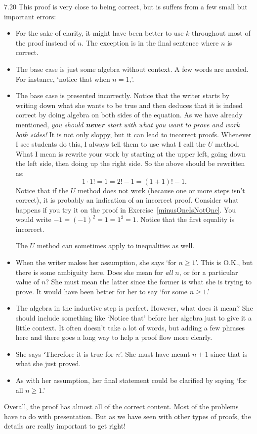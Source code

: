 \begin{Answer}{7.20}
This proof is very close to being correct, but is suffers from a few small but important errors:
\begin{itemize}
\item
For the sake of clarity, it might have been better to use $k$ throughout most of the proof
instead of $n$.  The exception is in the final sentence where $n$ is correct.
\item
The base case is just some algebra without context.  A few words are needed.  For instance,
`notice that when $n=1$,'.
\item
The base case is presented incorrectly.  Notice that the writer starts by writing down what
she wants to be true and then deduces that it is indeed correct by doing algebra on both sides
of the equation.  As we have already mentioned,
{\em you should {\bf never} start with what you want to prove and work both sides!}
It is not only sloppy, but it can lead to incorrect proofs.
Whenever I see students do this, I always tell them to use what I call the $U$ method.  What I mean
is rewrite your work by starting at the upper left, going down the left side, then doing up the
right side.  So the above should be rewritten as:
$$1\cdot 1! = 1 = 2!-1 = (1+1)!-1.$$
Notice that if the $U$ method does not work (because one
or more steps isn't correct), it is probably an indication
of an incorrect proof.  Consider what happens if you try it
on the proof in Exercise~\ref{minusOneIsNotOne}.  You would
write $-1=(-1)^2=1=1^2=1$.  Notice that the first equality
is incorrect.

The $U$ method can sometimes apply to inequalities as well.
\item
When the writer makes her assumption, she says `for $n\geq 1$'.  This is O.K., but there is some ambiguity
here.  Does she mean for {\em all} $n$, or for a particular value of $n$?  She must mean the latter since
the former is what she is trying to prove.  It would have been better for her to say `for some $n\geq 1$.'
\item
The algebra in the inductive step is perfect.  However, what does it mean?  She should include something like
`Notice that' before her algebra just to give it a little context.  It often doesn't take a lot of words,
but adding a few phrases here and there goes a long way to help a proof flow more clearly.
\item
She says `Therefore it is true for $n$'.  She must have meant $n+1$ since that is what she just proved.
\item
As with her assumption, her final statement could be clarified by saying `for all $n\geq 1$.'
\end{itemize}
Overall, the proof has almost all of the correct content.
Most of the problems have to do with presentation.
But as we have seen with
other types of proofs,
the details are really important to get right!
\end{Answer}
